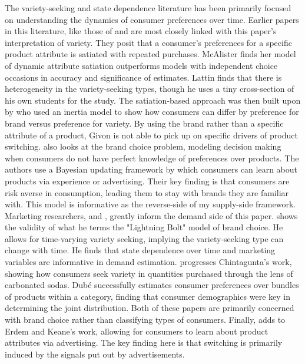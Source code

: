 \documentclass[11pt]{article}
\theoremstyle{definition}
\theoremstyle{remark}
\begin{document}
The variety-seeking and state dependence literature has been primarily focused on understanding the dynamics of consumer preferences over time. Earlier papers in this literature, like those of \citet{mcalister_dynamic_2026} and \citet{lattin_model_1987} are most closely linked with this paper's interpretation of variety. They posit that a consumer's preferences for a specific product attribute is satiated with repeated purchases. McAlister finds her model of dynamic attribute satiation outperforms models with independent choice occasions in accuracy and significance of estimates. Lattin finds that there is heterogeneity in the variety-seeking types, though he uses a tiny cross-section of his own students for the study. The satiation-based approach was then built upon by \citet{givon_variety_1984} who used an inertia model to show how consumers can differ by preference for brand versus preference for variety. By using the brand rather than a specific attribute of a product, Givon is not able to pick up on specific drivers of product switching. \citet{erdem_decision-making_1996} also looks at the brand choice problem, modeling decision making when consumers do not have perfect knowledge of preferences over products. The authors use a Bayesian updating framework by which consumers can learn about products via experience or advertising. Their key finding is that consumers are risk averse in consumption, leading them to stay with brands they are familiar with. This model is informative as the reverse-side of my supply-side framework. Marketing researchers, \citet{chintagunta_variety_1999} and \citet{dube_multiple_2004}, greatly inform the demand side of this paper. \citet{chintagunta_variety_1999} shows the validity of what he terms the "Lightning Bolt" model of brand choice. He allows for time-varying variety seeking, implying the variety-seeking type can change with time. He finds that state dependence over time and marketing variables are informative in demand estimation. \citet{dube_multiple_2004} progresses Chintagunta's work, showing how consumers seek variety in quantities purchased through the lens of carbonated sodas. Dub\'e successfully estimates consumer preferences over bundles of products within a category, finding that consumer demographics were key in determining the joint distribution. Both of these papers are primarily concerned with brand choice rather than classifying types of consumers. Finally, \citet{ackerberg_advertising_2003} adds to Erdem and Keane's work, allowing for consumers to learn about product attributes via advertising. The key finding here is that switching is primarily induced by the signals put out by advertisements.
\end{document}
